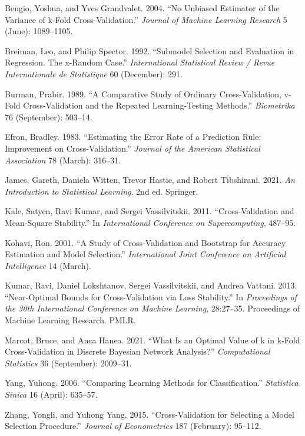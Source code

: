 \documentclass[
  12pt,
]{article}
\newlength{\cslhangindent}
\newlength{\cslentryspacingunit} %
\newenvironment{CSLReferences}[2] %
 {%
  \setlength{\parindent}{0pt}
  \ifodd #1
  \let\oldpar\par
  \def\par{\hangindent=\cslhangindent\oldpar}
  \fi
  \setlength{\parskip}{#2\cslentryspacingunit}
 }%
 {}
\begin{document}
\hypertarget{refs}{}
\begin{CSLReferences}{1}{0}
\leavevmode{}%
Bengio, Yoshua, and Yves Grandvalet. 2004. {``No Unbiased Estimator of
the Variance of k-Fold Cross-Validation.''} \emph{Journal of Machine
Learning Research} 5 (June): 1089--1105.

\leavevmode{}%
Breiman, Leo, and Philip Spector. 1992. {``Submodel Selection and
Evaluation in Regression. The x-Random Case.''} \emph{International
Statistical Review / Revue Internationale de Statistique} 60 (December):
291.

\leavevmode{}%
Burman, Prabir. 1989. {``A Comparative Study of Ordinary
Cross-Validation, v-Fold Cross-Validation and the Repeated
Learning-Testing Methods.''} \emph{Biometrika} 76 (September): 503--14.

\leavevmode{}%
Efron, Bradley. 1983. {``Estimating the Error Rate of a Prediction Rule:
Improvement on Cross-Validation.''} \emph{Journal of the American
Statistical Association} 78 (March): 316--31.

\leavevmode{}%
James, Gareth, Daniela Witten, Trevor Hastie, and Robert Tibshirani.
2021. \emph{An Introduction to Statistical Learning}. 2nd ed. Springer.

\leavevmode{}%
Kale, Satyen, Ravi Kumar, and Sergei Vassilvitskii. 2011.
{``Cross-Validation and Mean-Square Stability.''} In \emph{International
Conference on Supercomputing}, 487--95.

\leavevmode{}%
Kohavi, Ron. 2001. {``A Study of Cross-Validation and Bootstrap for
Accuracy Estimation and Model Selection.''} \emph{International Joint
Conference on Artificial Intelligence} 14 (March).

\leavevmode{}%
Kumar, Ravi, Daniel Lokshtanov, Sergei Vassilvitskii, and Andrea
Vattani. 2013. {``Near-Optimal Bounds for Cross-Validation via Loss
Stability.''} In \emph{Proceedings of the 30th International Conference
on Machine Learning}, 28:27--35. Proceedings of Machine Learning
Research. PMLR.

\leavevmode{}%
Marcot, Bruce, and Anca Hanea. 2021. {``What Is an Optimal Value of k in
k-Fold Cross-Validation in Discrete Bayesian Network Analysis?''}
\emph{Computational Statistics} 36 (September): 2009--31.

\leavevmode{}%
Yang, Yuhong. 2006. {``Comparing Learning Methods for Classification.''}
\emph{Statistica Sinica} 16 (April): 635--57.

\leavevmode{}%
Zhang, Yongli, and Yuhong Yang. 2015. {``Cross-Validation for Selecting
a Model Selection Procedure.''} \emph{Journal of Econometrics} 187
(February): 95--112.

\end{CSLReferences}
\end{document}
